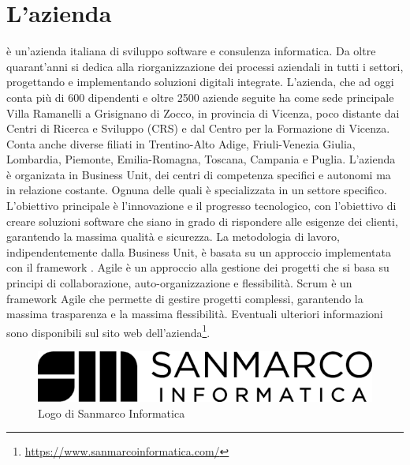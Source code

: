 \section{L'azienda}

\myCompany è un'azienda italiana di sviluppo software e consulenza informatica. Da oltre quarant'anni si dedica alla riorganizzazione dei processi aziendali in tutti i settori, progettando e implementando soluzioni digitali integrate. 
\newline
L'azienda, che ad oggi conta più di 600 dipendenti e oltre 2500 aziende seguite ha come sede principale Villa Ramanelli a Grisignano di Zocco, in provincia di Vicenza, poco distante dai Centri di Ricerca e Sviluppo (CRS) e dal Centro per la Formazione di Vicenza. Conta anche diverse filiati in Trentino-Alto Adige, Friuli-Venezia Giulia, Lombardia, Piemonte, Emilia-Romagna, Toscana, Campania e Puglia. 
\newline
L'azienda è organizata in Business Unit, dei centri di competenza specifici e autonomi ma in relazione costante. Ognuna delle quali è specializzata in un settore specifico. 
\newline
L'obiettivo principale è l'innovazione e il progresso tecnologico, con l'obiettivo di creare soluzioni software che siano in grado di rispondere alle esigenze dei clienti, garantendo la massima qualità e sicurezza.
\newline
La metodologia di lavoro, indipendentemente dalla Business Unit, è basata su un approccio  implementata con il framework . Agile è un approccio alla gestione dei progetti che si basa su principi di collaborazione, auto-organizzazione e flessibilità. Scrum è un framework Agile che permette di gestire progetti complessi, garantendo la massima trasparenza e la massima flessibilità.
\newline
Eventuali ulteriori informazioni sono disponibili sul sito web dell'azienda\footnote{\url{https://www.sanmarcoinformatica.com/}}.
\begin{figure}[h!]
    \centering
    \includegraphics[width=0.5\columnwidth]{img/logo_sanmarco_informatica.png}
    \caption{Logo di Sanmarco Informatica}
    \label{fig:entanglement}
\end{figure}
